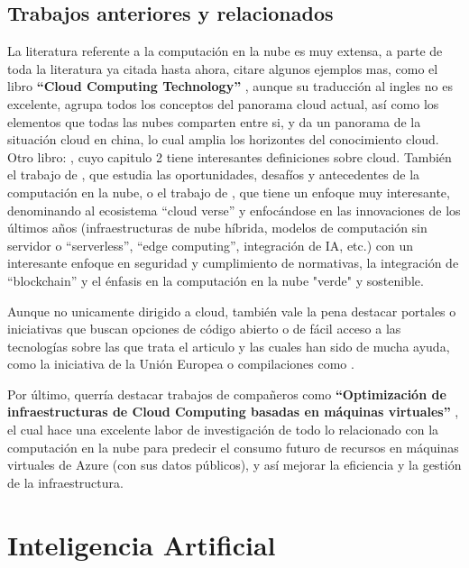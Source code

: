 \subsection{Trabajos anteriores y relacionados}

La literatura referente a la computación en la nube es muy extensa, a parte de toda la literatura ya citada hasta ahora, citare algunos ejemplos mas, como el libro \textbf{``Cloud Computing Technology''} \citep{huawei2023cloud}, aunque su traducción al ingles no es excelente, agrupa todos los conceptos del panorama cloud actual, así como los elementos que todas las nubes comparten entre si, y da un panorama de la situación cloud en china, lo cual amplia los horizontes del conocimiento cloud. Otro libro: \citep{Fowdur2021}, cuyo capitulo 2 tiene interesantes definiciones sobre cloud. También el trabajo de \citep{nigro2022}, que estudia las oportunidades, desafíos y antecedentes de la computación en la nube, o el trabajo de \citep{bommala2024}, que tiene un enfoque muy interesante, denominando al ecosistema ``cloud verse'' y enfocándose en las innovaciones de los últimos años (infraestructuras de nube híbrida, modelos de computación sin servidor o ``serverless'', ``edge computing'', integración de IA, etc.) con un interesante enfoque en seguridad y cumplimiento de normativas, la integración de ``blockchain'' y el énfasis en la computación en la nube "verde" y sostenible. 

Aunque no unicamente dirigido a cloud, también vale la pena destacar portales o iniciativas que buscan opciones de código abierto o de fácil acceso a las tecnologías sobre las que trata el articulo y las cuales han sido de mucha ayuda, como la iniciativa de la Unión Europea \citep{EuropeanAlternatives} o compilaciones como \citep{free-for-dev}.

Por último, querría destacar trabajos de compañeros como \textbf{``Optimización de infraestructuras de Cloud Computing basadas en máquinas virtuales''} \citep{sanchez2023optimizacion}, el cual hace una excelente labor de investigación de todo lo relacionado con la computación en la nube para predecir el consumo futuro de recursos en máquinas virtuales de Azure (con sus datos públicos), y así mejorar la eficiencia y la gestión de la infraestructura. \newpage


\newpage


\section{Inteligencia Artificial}
\label{sec:EstudiosIA}

